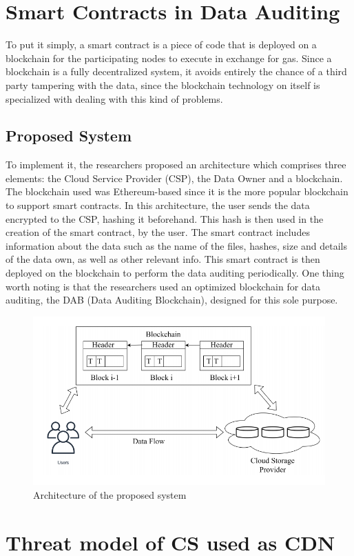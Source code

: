 \documentclass[14pt,oneside]{extreport}
\begin{document}
\section{Smart Contracts in Data Auditing}
To put it simply, a smart contract is a piece of code that is deployed on a blockchain for the participating nodes to execute in exchange for gas. Since a blockchain is a fully decentralized system, it avoids entirely the chance of a third party tampering with the data, since the blockchain technology on itself is specialized with dealing with this kind of problems.
\subsection{Proposed System}
To implement it, the researchers proposed an architecture which comprises three elements: the Cloud Service Provider (CSP), the Data Owner and a blockchain. The blockchain used was Ethereum-based since it is the more popular blockchain to support smart contracts. In this architecture, the user sends the data encrypted to the CSP, hashing it beforehand. This hash is then used in the creation of the smart contract, by the user. The smart contract includes information about the data such as the name of the files, hashes, size and details of the data own, as well as other relevant info. This smart contract is then deployed on the blockchain to perform the data auditing periodically. One thing worth noting is that the researchers used an optimized blockchain for data auditing, the DAB (Data Auditing Blockchain), designed for this sole purpose.
\begin{figure}[H]
  \centering
  \includegraphics[width=\textwidth]{paper5/arquitetura.png}
  \caption{Architecture of the proposed system}
  \label{fig:image}
\end{figure}
\section{Threat model of CS used as CDN}
\end{document}
